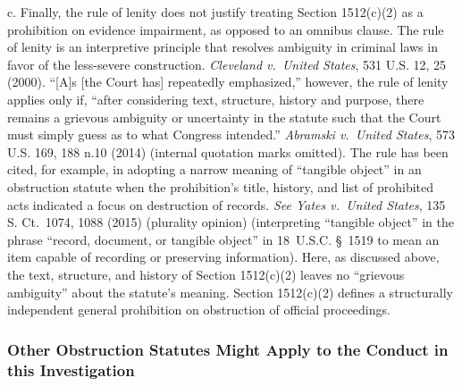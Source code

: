 c. Finally, the rule of lenity does not justify treating Section 1512(c)(2) as a prohibition on evidence impairment, as opposed to an omnibus clause.
The rule of lenity is an interpretive principle that resolves ambiguity in criminal laws in favor of the less-severe construction.
\textit{Cleveland v.\ United States}, 531 U.S. 12, 25 (2000).
``[A]s [the Court has] repeatedly emphasized,'' however, the rule of lenity applies only if, ``after considering text, structure, history and purpose, there remains a grievous ambiguity or uncertainty in the statute such that the Court must simply guess as to what Congress intended.''
\textit{Abramski v.\ United States}, 573 U.S. 169, 188 n.10 (2014) (internal quotation marks omitted).
The rule has been cited, for example, in adopting a narrow meaning of ``tangible object'' in an obstruction statute when the prohibition's title, history, and list of prohibited acts indicated a focus on destruction of records.
\textit{See Yates v.\ United States}, 135 S. Ct.~1074, 1088 (2015) (plurality opinion) (interpreting ``tangible object'' in the phrase ``record, document, or tangible object'' in 18~U.S.C. \S~1519 to mean an item capable of recording or preserving information).
Here, as discussed above, the text, structure, and history of Section 1512(c)(2) leaves no ``grievous ambiguity'' about the statute's meaning.
Section 1512(c)(2) defines a structurally independent general prohibition on obstruction of official proceedings.

\subsubsection{Other Obstruction Statutes Might Apply to the Conduct in this Investigation}

